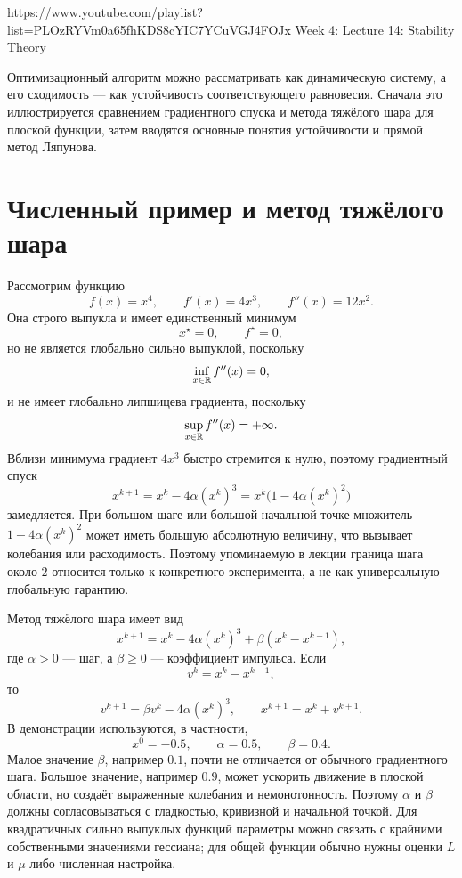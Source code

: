 
\sourcevideo
    {https://www.youtube.com/playlist?list=PLOzRYVm0a65fhKDS8cYIC7YCuVGJ4FOJx}
    {Week 4: Lecture 14: Stability Theory}

Оптимизационный алгоритм можно рассматривать как динамическую
систему, а его сходимость --- как устойчивость соответствующего
равновесия. Сначала это иллюстрируется сравнением градиентного спуска
и метода тяжёлого шара для плоской функции, затем вводятся основные
понятия устойчивости и прямой метод Ляпунова.

\section{Численный пример и метод тяжёлого шара}

Рассмотрим функцию
\[
    f(x)=x^4,
    \qquad
    f'(x)=4x^3,
    \qquad
    f''(x)=12x^2.
\]
Она строго выпукла и имеет единственный минимум
\[
    x^\star=0,
    \qquad
    f^\star=0,
\]
но не является глобально сильно выпуклой, поскольку
\[
    \inf_{x\in\mathbb{R}}f''(x)=0,
\]
и не имеет глобально липшицева градиента, поскольку
\[
    \sup_{x\in\mathbb{R}}f''(x)=+\infty.
\]
Вблизи минимума градиент \(4x^3\) быстро стремится к нулю, поэтому
градиентный спуск
\[
    x^{k+1}
    =
    x^k-4\alpha(x^k)^3
    =
    x^k\bigl(1-4\alpha(x^k)^2\bigr)
\]
замедляется. При большом шаге или большой начальной точке множитель
\(1-4\alpha(x^k)^2\) может иметь большую абсолютную величину, что
вызывает колебания или расходимость. Поэтому упоминаемую в лекции
граница шага около \(2\) относится только к конкретного эксперимента, а не как универсальную глобальную гарантию.

Метод тяжёлого шара имеет вид
\[
    x^{k+1}
    =
    x^k-4\alpha(x^k)^3
    +\beta(x^k-x^{k-1}),
\]
где \(\alpha>0\) --- шаг, а \(\beta\ge0\) --- коэффициент импульса.
Если
\[
    v^k=x^k-x^{k-1},
\]
то
\[
    v^{k+1}=\beta v^k-4\alpha(x^k)^3,
    \qquad
    x^{k+1}=x^k+v^{k+1}.
\]
В демонстрации используются, в частности,
\[
    x^0=-0.5,
    \qquad
    \alpha=0.5,
    \qquad
    \beta=0.4.
\]
Малое значение \(\beta\), например \(0.1\), почти не отличается от
обычного градиентного шага. Большое значение, например \(0.9\), может
ускорить движение в плоской области, но создаёт выраженные колебания
и немонотонность. Поэтому \(\alpha\) и \(\beta\) должны
согласовываться с гладкостью, кривизной и начальной точкой. Для
квадратичных сильно выпуклых функций параметры можно связать с
крайними собственными значениями гессиана; для общей функции обычно
нужны оценки \(L\) и \(\mu\) либо численная настройка.

